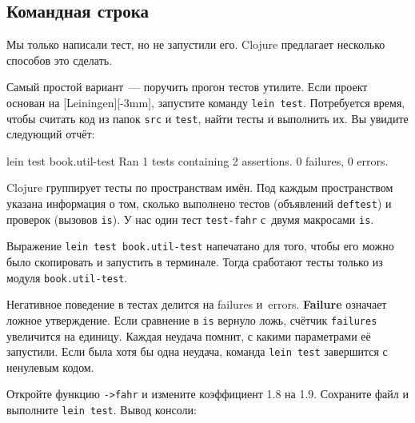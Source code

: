 \subsection{Командная строка}

Мы только написали тест, но не запустили его. Clojure предлагает несколько
способов это сделать.


Самый простой вариант~--- поручить прогон тестов утилите. Если проект основан на
[Leiningen][-3mm], запустите команду \verb|lein test|.
Потребуется время, чтобы считать код из папок \verb|src| и \verb|test|,
найти тесты и выполнить их. Вы увидите следующий отчёт:

\begin{english}
  \begin{text}
lein test book.util-test
Ran 1 tests containing 2 assertions.
0 failures, 0 errors.
  \end{text}
\end{english}

Clojure группирует тесты по пространствам имён. Под каждым пространством указана
информация о том, сколько выполнено тестов (объявлений \verb|deftest|) и
проверок (вызовов \verb|is|). У нас один тест \verb|test-fahr| с~двумя макросами
\verb|is|.


Выражение \verb|lein test book.util-test| напечатано для того, чтобы его можно
было скопировать и запустить в терминале. Тогда сработают тесты только из модуля
\verb|book.util-test|.

Негативное поведение в тестах делится на failures
и~errors. \textbf{Failure}  означает ложное утверждение. Если
сравнение в \verb|is| вернуло ложь, счётчик \verb|failures| увеличится на
единицу. Каждая неудача помнит, с какими параметрами её запустили. Если была
хотя бы одна неудача, команда \verb|lein test| завершится с ненулевым кодом.

Откройте функцию \verb|->fahr| и измените коэффициент 1.8 на 1.9. Сохраните файл
и выполните \verb|lein test|. Вывод консоли:

\begin{english}
\end{english}

